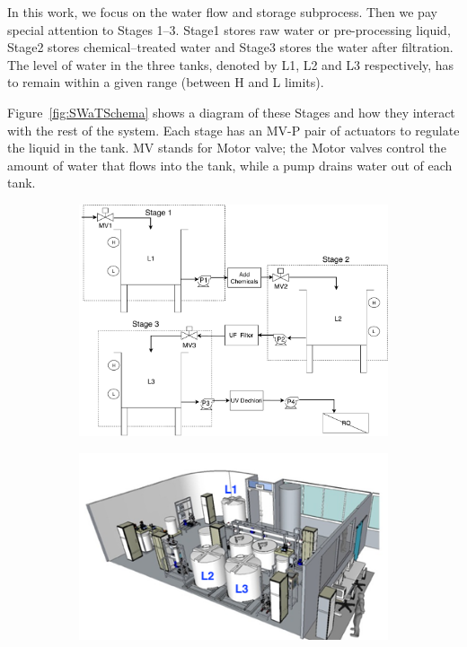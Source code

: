 {{In this work, we focus on the water flow and storage subprocess. Then we pay special attention to Stages 1--3. Stage1 stores raw water or pre-processing liquid, Stage2 stores chemical--treated water and Stage3 stores the water after filtration.
The level of water in the three tanks, denoted by L1, L2 and L3 respectively, has to remain within a given range (between H and L limits).}

Figure~\ref{fig:SWaTSchema} shows a diagram of these Stages and how they interact with the rest of the system. 
Each stage has an MV-P pair of actuators to regulate the liquid in the tank. MV stands for Motor valve; the Motor valves control the amount of water that flows into the tank, while a pump drains water out of each tank.


\begin{figure}[htb]
  \centering
  \begin{subfigure}[b]{.65\linewidth}
  \includegraphics[width=\linewidth]{Figures/SWaT_allTanks-Stages}
  \end{subfigure}
  \begin{subfigure}[b]{.35\linewidth}
  \includegraphics[width=\linewidth]{Figures/testbed.png}

\end{subfigure}
\end{figure}}
